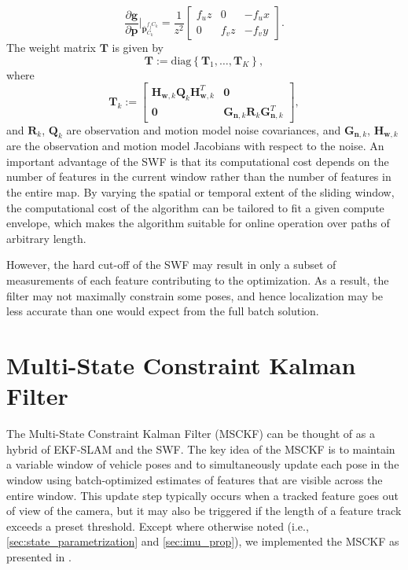 \documentclass[letterpaper, 10 pt, conference]{ieeeconf}  %
\def\Vec#1{\mathbf{#1}}
\newcommand{\bbm}{\begin{bmatrix}}
\newcommand{\ebm}{\end{bmatrix}}
\newcommand{\pd}[2]{\frac{\partial #1}{\partial #2}}
\begin{document}
\begin{equation}
\pd{\Vec g}{ \Vec p}\Bigr|_{\bar{\Vec p}_{C_k}^{f_j C_k}} = \frac{1}{z^2} \bbm f_u z & 0 & - f_u x \\  0 & f_v z & -f_v y \ebm.
\end{equation}
The weight matrix $\Vec T$ is given by
\begin{equation}
\Vec{T} := \text{diag} \left\{ \Vec{T}_1,\hdots,\Vec{T}_K \right\},
\end{equation}
where
\begin{equation}
\Vec{T}_k := \bbm \Vec H_{\Vec w, k} \Vec Q_k \Vec H_{\Vec w, k}^T & \Vec 0 \\
\Vec 0 & \Vec G_{\Vec n, k} \Vec R_k \Vec G_{\Vec n, k}^T \ebm,
\end{equation}
and $\Vec R_k$, $\Vec Q_k$ are observation and motion model noise covariances, and $\Vec G_{\Vec n, k}$, $\Vec H_{\Vec w, k}$ are the observation and motion model Jacobians with respect to the noise. 
An important advantage of the SWF is that its computational cost depends on the number of features in the current window rather than the number of features in the entire map.
By varying the spatial or temporal extent of the sliding window, the computational cost of the algorithm can be tailored to fit a given compute envelope, which makes the algorithm suitable for online operation over paths of arbitrary length.

However, the hard cut-off of the SWF may result in only a subset of measurements of each feature contributing to the optimization.
As a result, the filter may not maximally constrain some poses, and hence localization may be less accurate than one would expect from the full batch solution.

\section{Multi-State Constraint Kalman Filter} \label{sec:MSCKF}
The Multi-State Constraint Kalman Filter (MSCKF) \cite{Mourikis:2006:TechReport,Mourikis:2007:ICRA} can be thought of as a hybrid of EKF-SLAM and the SWF.
The key idea of the MSCKF is to maintain a variable window of vehicle poses and to simultaneously update each pose in the window using batch-optimized estimates of features that are visible across the entire window.
This update step typically occurs when a tracked feature goes out of view of the camera, but it may also be triggered if the length of a feature track exceeds a preset threshold.
Except where otherwise noted (i.e., \ref{sec:state_parametrization} and \ref{sec:imu_prop}), we implemented the MSCKF as presented in \cite{Mourikis:2006:TechReport, Mourikis:2007:ICRA}.
\end{document}
